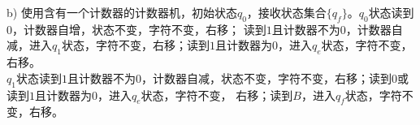 \begin{solution}b)
    使用含有一个计数器的计数器机，初始状态$q_0$，接收状态集合$\{q_f\}$。$q_0$状态读到$0$，计数器自增，状态不变，字符不变，右移；
    读到$1$且计数器不为0，计数器自减，进入$q_1$状态，字符不变，右移；读到$1$且计数器为0，进入$q_e$状态，字符不变，右移。\\
    $q_1$状态读到$1$且计数器不为0，计数器自减，状态不变，字符不变，右移；读到$0$或读到$1$且计数器为0，进入$q_e$状态，字符不变，
    右移；读到$B$，进入$q_f$状态，字符不变，右移。
\end{solution}